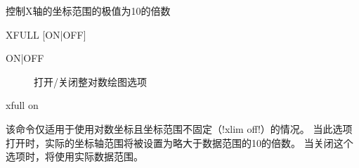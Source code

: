 \label{cmd:xfull}

控制X轴的坐标范围的极值为10的倍数

\begin{SACSTX}
XFULL [ON|OFF]
\end{SACSTX}

\begin{description}
\item [ON|OFF] 打开/关闭整对数绘图选项
\end{description}

\begin{SACDFT}
xfull on
\end{SACDFT}

该命令仅适用于使用对数坐标且坐标范围不固定（!xlim off!）的情况。
当此选项打开时，实际的坐标轴范围将被设置为略大于数据范围的10的倍数。
当关闭这个选项时，将使用实际数据范围。

